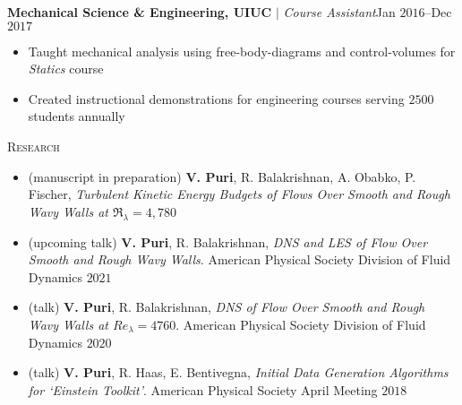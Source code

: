 \documentclass[10pt]{article}
\begin{document}
\begin{multicols}{2}
\vspace{0.5em}
%
\textbf{Mechanical Science \& Engineering, UIUC} $|$ \textit{Course Assistant}\hfill Jan $2016$--Dec $2017$

\vspace{-1.75em}
\begin{itemize}[label=-,leftmargin=1.0em]
    \setlength\itemsep{-0.25em}
    \item Taught mechanical analysis using free-body-diagrams and control-volumes for \textit{Statics} course
    \item Created instructional demonstrations for engineering courses serving $2500$ students annually
\end{itemize}
\vspace{-2.0em}

\end{multicols}
\vspace{-1.5em}
\begin{multicols}{2}
\textsc{Research}
\columnbreak

\vspace{-1.75em}
\begin{itemize}[label= ,leftmargin= 1.0em]
    \setlength{\itemindent}{-1.0em}
    \setlength\itemsep{-0.25em}
    \item (manuscript in preparation) \textbf{V. Puri}, R. Balakrishnan, A. Obabko, P. Fischer, \textit{Turbulent Kinetic Energy Budgets of Flows Over Smooth and Rough Wavy Walls at $\Re_\lambda=4,780$}
    \item (upcoming talk) \textbf{V. Puri}, R. Balakrishnan, \textit{DNS and LES of Flow Over Smooth and Rough Wavy Walls}. American Physical Society Division of Fluid Dynamics $2021$
    \item (talk) \textbf{V. Puri}, R. Balakrishnan, \textit{DNS of Flow Over Smooth and Rough Wavy Walls at $\mathit{Re}_\lambda=4760$}. American Physical Society Division of Fluid Dynamics $2020$
    \item (talk) \textbf{V. Puri}, R. Haas, E. Bentivegna, \textit{Initial Data Generation Algorithms for `Einstein Toolkit'}. American Physical Society April Meeting $2018$
\end{itemize}
\vspace{-2.0em}

\end{multicols}
\end{document}
